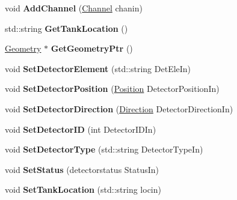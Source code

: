\begin{DoxyCompactItemize}
\item 
\hypertarget{classDetector_adc95528c7b20269f2f30a6d5330a7fd7}{void {\bfseries Add\-Channel} (\hyperlink{classChannel}{Channel} chanin)}\label{classDetector_adc95528c7b20269f2f30a6d5330a7fd7}

\item 
\hypertarget{classDetector_aa87b945be097376ed4d9e7ad11da60f5}{std\-::string {\bfseries Get\-Tank\-Location} ()}\label{classDetector_aa87b945be097376ed4d9e7ad11da60f5}

\item 
\hypertarget{classDetector_ac0b5f82030923f555f4420c110de97b0}{\hyperlink{classGeometry}{Geometry} $\ast$ {\bfseries Get\-Geometry\-Ptr} ()}\label{classDetector_ac0b5f82030923f555f4420c110de97b0}

\item 
\hypertarget{classDetector_a5a447c98e1cda4bcb669d6f0cf7f372e}{void {\bfseries Set\-Detector\-Element} (std\-::string Det\-Ele\-In)}\label{classDetector_a5a447c98e1cda4bcb669d6f0cf7f372e}

\item 
\hypertarget{classDetector_a388c07e8a741d22a5dcec27ae0718223}{void {\bfseries Set\-Detector\-Position} (\hyperlink{classPosition}{Position} Detector\-Position\-In)}\label{classDetector_a388c07e8a741d22a5dcec27ae0718223}

\item 
\hypertarget{classDetector_a349a08c4b6eb90415971d798f6c35466}{void {\bfseries Set\-Detector\-Direction} (\hyperlink{classDirection}{Direction} Detector\-Direction\-In)}\label{classDetector_a349a08c4b6eb90415971d798f6c35466}

\item 
\hypertarget{classDetector_ac6b4e26f7391b0e96cddf047aec6baf3}{void {\bfseries Set\-Detector\-I\-D} (int Detector\-I\-D\-In)}\label{classDetector_ac6b4e26f7391b0e96cddf047aec6baf3}

\item 
\hypertarget{classDetector_ac903797b8948e0107de513de60757b2e}{void {\bfseries Set\-Detector\-Type} (std\-::string Detector\-Type\-In)}\label{classDetector_ac903797b8948e0107de513de60757b2e}

\item 
\hypertarget{classDetector_a912c695a5b4c7bdac1fd6d408cb4e943}{void {\bfseries Set\-Status} (detectorstatus Status\-In)}\label{classDetector_a912c695a5b4c7bdac1fd6d408cb4e943}

\item 
\hypertarget{classDetector_acc18123ffd61248f94f86eae4a54a0af}{void {\bfseries Set\-Tank\-Location} (std\-::string locin)}\label{classDetector_acc18123ffd61248f94f86eae4a54a0af}


\end{DoxyCompactItemize}
